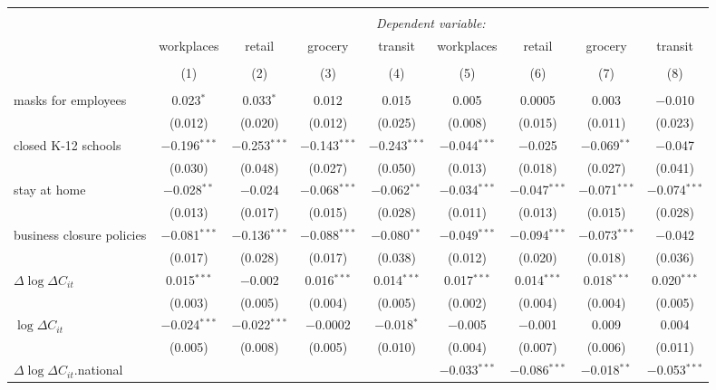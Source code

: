 \begin{tabular}{@{\extracolsep{1pt}}lcccccccc} 
\\[-1.8ex]\hline 
\hline \\[-1.8ex] 
 & \multicolumn{8}{c}{\textit{Dependent variable:}} \\ 
\cline{2-9} 
 & workplaces & retail & grocery & transit & workplaces & retail & grocery & transit \\ 
\\[-1.8ex] & (1) & (2) & (3) & (4) & (5) & (6) & (7) & (8)\\ 
\hline \\[-1.8ex] 
 masks for employees & 0.023$^{*}$ & 0.033$^{*}$ & 0.012 & 0.015 & 0.005 & 0.0005 & 0.003 & $-$0.010 \\ 
  & (0.012) & (0.020) & (0.012) & (0.025) & (0.008) & (0.015) & (0.011) & (0.023) \\ 
  closed K-12 schools & $-$0.196$^{***}$ & $-$0.253$^{***}$ & $-$0.143$^{***}$ & $-$0.243$^{***}$ & $-$0.044$^{***}$ & $-$0.025 & $-$0.069$^{**}$ & $-$0.047 \\ 
  & (0.030) & (0.048) & (0.027) & (0.050) & (0.013) & (0.018) & (0.027) & (0.041) \\ 
  stay at home & $-$0.028$^{**}$ & $-$0.024 & $-$0.068$^{***}$ & $-$0.062$^{**}$ & $-$0.034$^{***}$ & $-$0.047$^{***}$ & $-$0.071$^{***}$ & $-$0.074$^{***}$ \\ 
  & (0.013) & (0.017) & (0.015) & (0.028) & (0.011) & (0.013) & (0.015) & (0.028) \\ 
  business closure policies & $-$0.081$^{***}$ & $-$0.136$^{***}$ & $-$0.088$^{***}$ & $-$0.080$^{**}$ & $-$0.049$^{***}$ & $-$0.094$^{***}$ & $-$0.073$^{***}$ & $-$0.042 \\ 
  & (0.017) & (0.028) & (0.017) & (0.038) & (0.012) & (0.020) & (0.018) & (0.036) \\ 
  $\Delta \log \Delta C_{it}$ & 0.015$^{***}$ & $-$0.002 & 0.016$^{***}$ & 0.014$^{***}$ & 0.017$^{***}$ & 0.014$^{***}$ & 0.018$^{***}$ & 0.020$^{***}$ \\ 
  & (0.003) & (0.005) & (0.004) & (0.005) & (0.002) & (0.004) & (0.004) & (0.005) \\ 
  $\log \Delta C_{it}$ & $-$0.024$^{***}$ & $-$0.022$^{***}$ & $-$0.0002 & $-$0.018$^{*}$ & $-$0.005 & $-$0.001 & 0.009 & 0.004 \\ 
  & (0.005) & (0.008) & (0.005) & (0.010) & (0.004) & (0.007) & (0.006) & (0.011) \\ 
  $\Delta \log \Delta C_{it}$.national &  &  &  &  & $-$0.033$^{***}$ & $-$0.086$^{***}$ & $-$0.018$^{**}$ & $-$0.053$^{***}$ \\ 

\end{tabular}
